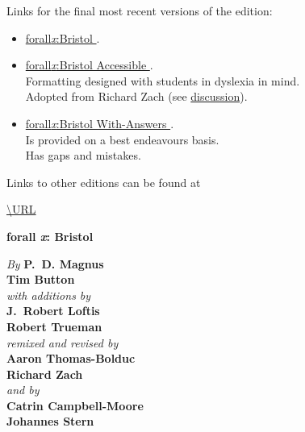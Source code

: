 


\pagestyle{empty}


\newpage
\noindent Links for the \iffinalversion
			final
			\else
			most recent
			\fi
			versions of the \AcademicYearText edition:
\begin{itemize}
	\item \href{\URLforEditionVersions/forallxbris.pdf}{forall\textit{x}:Bristol \AcademicYearText}. 
	\item \href{\URLforEditionVersions/forallxbris-accessible.pdf}{forall\textit{x}:Bristol Accessible \AcademicYearText}. \\Formatting designed with students in dyslexia in mind. \\Adopted from Richard Zach (see \href{https://richardzach.org/2017/11/making-an-accessible-open-logic-textbook-for-dyslexics/}{discussion}).
	\item \href{\URLforEditionVersions/forallxbris-withanswers.pdf}{forall\textit{x}:Bristol With-Answers \AcademicYearText}. \\Is provided on a best endeavours basis. \\Has gaps and mistakes.
\end{itemize}

\bigskip 
\noindent Links to other editions can be found at \begin{center}
	\url{\URL}
\end{center}

\newpage

\vspace*{80pt}



\begin{center}
\fontsize{30pt}{24pt}\sffamily
\selectfont
  \textbf{forall\!
  {\fontsize{37pt}{24pt}\selectfont\rmfamily\textit{x}}: 
  Bristol}
\end{center}


\vfill\noindent
\fontsize{12pt}{16pt}\selectfont \textit{By } \textbf{P.~D. Magnus}\\
\textbf{Tim Button}\\
\textit{with additions by}\\
\textbf{J.~Robert Loftis}\\
\textbf{Robert Trueman}\\
\textit{remixed and revised by}\\
\textbf{Aaron Thomas-Bolduc}\\ \textbf{Richard Zach}\\
\textit{and by}\\
\textbf{Catrin Campbell-Moore}\\ \textbf{Johannes Stern}


